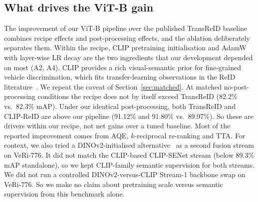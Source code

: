 \subsection{What drives the ViT-B gain}
The improvement of our ViT-B pipeline over the published TransReID baseline combines recipe effects and post-processing effects, and the ablation deliberately separates them. Within the recipe, CLIP pretraining initialisation and AdamW with layer-wise LR decay are the two ingredients that our development depended on most (A2, A4). CLIP provides a rich visual-semantic prior for fine-grained vehicle discrimination, which fits transfer-learning observations in the ReID literature~\cite{li2023clipreid,radford2021clip}. We repeat the caveat of Section~\ref{sec:matched}. At matched no-post-processing conditions the recipe does not by itself exceed TransReID (82.2\% vs.\ 82.3\% mAP). Under our identical post-processing, both TransReID and CLIP-ReID are above our pipeline (91.12\% and 91.80\% vs.\ 89.97\%). So these are drivers within our recipe, not net gains over a tuned baseline. Most of the reported improvement comes from AQE, $k$-reciprocal re-ranking and TTA. For context, we also tried a DINOv2-initialised alternative~\cite{oquab2023dinov2} as a second fusion stream on VeRi-776. It did not match the CLIP-based CLIP-SENet stream (below 89.3\% mAP standalone), so we kept CLIP-family semantic supervision for both streams. We did not run a controlled DINOv2-versus-CLIP Stream-1 backbone swap on VeRi-776. So we make no claim about pretraining scale versus semantic supervision from this benchmark alone.
